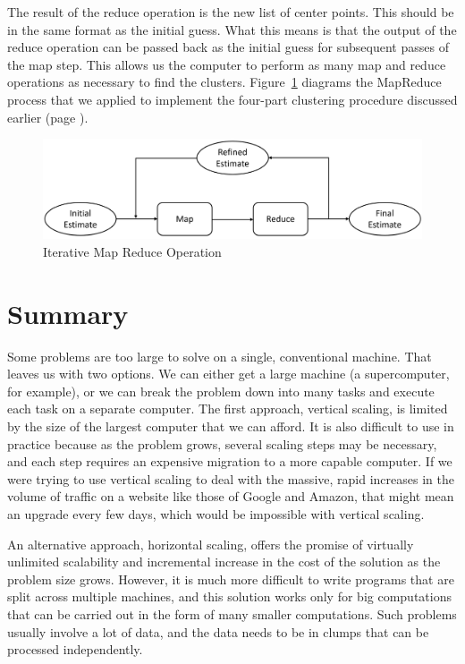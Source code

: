 The result of the reduce operation is the new list of center points.
This should be in the same format as the initial guess.
What this means is that the output of the
reduce operation can be passed back as
the initial guess for subsequent passes of the map step.
This allows us the computer to perform as many map and reduce operations as necessary
to find the clusters. Figure~\ref{iterative-map-reduce} diagrams the MapReduce
process that we applied to implement the four-part clustering procedure
discussed earlier (page \pageref{cluster-process}).

\begin{figure}
    \begin{center}
        \includegraphics[scale=0.2]{images/iterative-map-reduce-rev}
    \end{center}
    \caption{Iterative Map Reduce Operation}
    \label{iterative-map-reduce}
\end{figure}

\section{Summary}

Some problems are too large to solve on a single, conventional machine.  That leaves us
with two options.  We can either get a large machine (a supercomputer, for example),
or we can break the problem down into many tasks and execute each task on a separate computer.
The first approach, vertical scaling, is limited by the size of the largest computer that
we can afford.  It is also difficult to use in practice because as the problem grows,
several scaling steps may be
necessary, and each step requires an expensive migration to a more capable computer.
If we were trying to use vertical scaling to deal with the massive, rapid increases
in the volume of traffic on a website like those of Google and Amazon,
that might mean an upgrade every few days, which would be impossible with
vertical scaling.

An alternative approach, horizontal scaling, 
offers the promise of virtually unlimited
scalability and incremental increase 
in the cost of the solution as the problem size grows.
However, it is much more difficult 
to write programs that are split across multiple machines,
and this solution works only 
for big computations that can be carried out
in the form of many smaller computations.
Such problems usually involve a lot of data, 
and the data needs to be in clumps
that can be processed independently.

